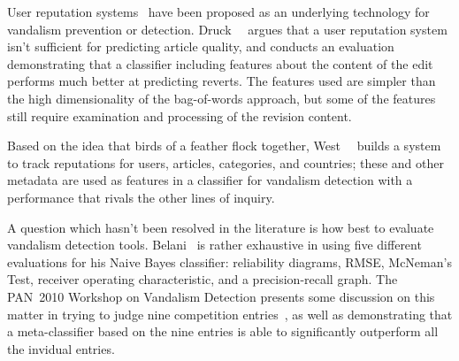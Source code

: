 User reputation systems~\cite{WikiTrust06,WikiMTWtrust06,www07}
have been proposed as an underlying technology for vandalism
prevention or detection.
Druck~\etal~\cite{Druck2008} argues that a user reputation system isn't
sufficient for predicting article quality, and conducts an evaluation
demonstrating that a classifier including features about the content
of the edit performs much better at predicting reverts.
The features used are simpler than the high dimensionality of
the bag-of-words approach, but some of the features still require
examination and processing of the revision content.

Based on the idea that birds of a feather flock together,
West~\etal~\cite{West2010} builds a system to track reputations
for users, articles, categories, and countries; these and other metadata
are used as features in a classifier for vandalism detection with
a performance that rivals the other lines of inquiry.


A question which hasn't been resolved in the literature is how best to
evaluate vandalism detection tools.
Belani~\cite{Belani2010} is rather exhaustive in using five different
evaluations for his Naive Bayes classifier: reliability diagrams,
RMSE, McNeman's Test, receiver operating characteristic,
and a precision-recall graph.
The PAN~2010 Workshop on Vandalism Detection presents some discussion
on this matter in trying to judge nine competition
entries~\cite{Potthast2010b}, as well as demonstrating that a
meta-classifier based on the nine entries is able to significantly
outperform all the invidual entries.



